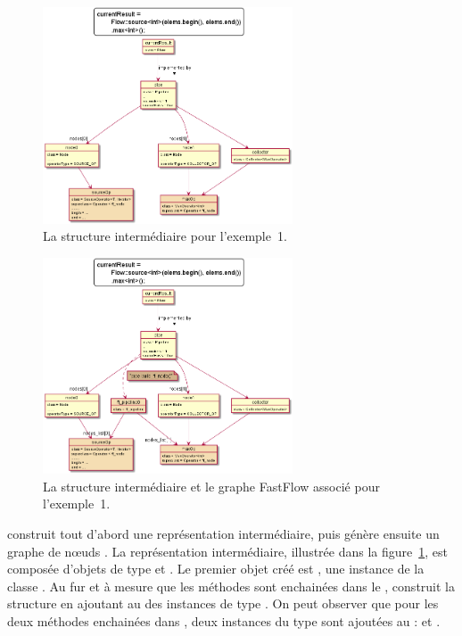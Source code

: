 \begin{figure}
\centering
         \includegraphics[width=0.66\textwidth]{Figures/objets1-ppff.png}
      \caption{La structure interm\'ediaire  pour l'exemple~1.}
       \label{objets1-ppff.fig}
\end{figure}


\begin{figure}
\centering
         \includegraphics[width=0.66\textwidth]{Figures/objets1-ff.png}
      \caption{La structure interm\'ediaire  et le graphe FastFlow associé pour l'exemple~1.}
       \label{objets1-ff.fig}
\end{figure}

 construit tout d'abord une repr\'esentation interm\'ediaire, puis g\'en\`ere ensuite un graphe de n\oe{}uds . La repr\'esentation interm\'ediaire, illustr\'ee dans la figure~\ref{objets1-ppff.fig}, est compos\'ee d'objets de type  et . Le premier objet cr\'e\'e est , une instance de la classe . Au fur et \`a mesure que les m\'ethodes sont enchain\'ees dans le ,  construit la structure en ajoutant au  des instances de type . On peut observer que pour les deux m\'ethodes enchain\'ees dans , deux instances du type  sont ajout\'ees au  :  et . 


